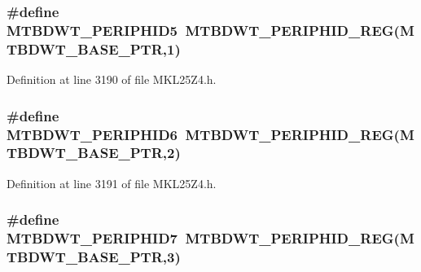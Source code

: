 \subsubsection[{\texorpdfstring{M\+T\+B\+D\+W\+T\+\_\+\+P\+E\+R\+I\+P\+H\+I\+D5}{MTBDWT_PERIPHID5}}]{\setlength{\rightskip}{0pt plus 5cm}\#define M\+T\+B\+D\+W\+T\+\_\+\+P\+E\+R\+I\+P\+H\+I\+D5~{\bf M\+T\+B\+D\+W\+T\+\_\+\+P\+E\+R\+I\+P\+H\+I\+D\+\_\+\+R\+EG}({\bf M\+T\+B\+D\+W\+T\+\_\+\+B\+A\+S\+E\+\_\+\+P\+TR},1)}\hypertarget{group___m_t_b_d_w_t___register___accessor___macros_ga784ae33118477a2b68ce261e0caf4b85}{}\label{group___m_t_b_d_w_t___register___accessor___macros_ga784ae33118477a2b68ce261e0caf4b85}


Definition at line 3190 of file M\+K\+L25\+Z4.\+h.

\subsubsection[{\texorpdfstring{M\+T\+B\+D\+W\+T\+\_\+\+P\+E\+R\+I\+P\+H\+I\+D6}{MTBDWT_PERIPHID6}}]{\setlength{\rightskip}{0pt plus 5cm}\#define M\+T\+B\+D\+W\+T\+\_\+\+P\+E\+R\+I\+P\+H\+I\+D6~{\bf M\+T\+B\+D\+W\+T\+\_\+\+P\+E\+R\+I\+P\+H\+I\+D\+\_\+\+R\+EG}({\bf M\+T\+B\+D\+W\+T\+\_\+\+B\+A\+S\+E\+\_\+\+P\+TR},2)}\hypertarget{group___m_t_b_d_w_t___register___accessor___macros_gac164f79edd8679be62049881e3e01e68}{}\label{group___m_t_b_d_w_t___register___accessor___macros_gac164f79edd8679be62049881e3e01e68}


Definition at line 3191 of file M\+K\+L25\+Z4.\+h.

\subsubsection[{\texorpdfstring{M\+T\+B\+D\+W\+T\+\_\+\+P\+E\+R\+I\+P\+H\+I\+D7}{MTBDWT_PERIPHID7}}]{\setlength{\rightskip}{0pt plus 5cm}\#define M\+T\+B\+D\+W\+T\+\_\+\+P\+E\+R\+I\+P\+H\+I\+D7~{\bf M\+T\+B\+D\+W\+T\+\_\+\+P\+E\+R\+I\+P\+H\+I\+D\+\_\+\+R\+EG}({\bf M\+T\+B\+D\+W\+T\+\_\+\+B\+A\+S\+E\+\_\+\+P\+TR},3)}\hypertarget{group___m_t_b_d_w_t___register___accessor___macros_ga6f2e5a20f256ee541d4adc833f8d00ed}{}\label{group___m_t_b_d_w_t___register___accessor___macros_ga6f2e5a20f256ee541d4adc833f8d00ed}


